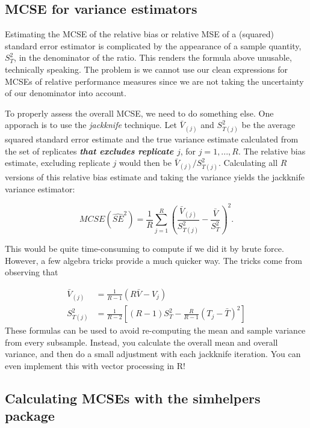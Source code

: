 \documentclass[
]{book}
\begin{document}
\hypertarget{mcse-for-variance-estimators}{%
\subsection{MCSE for variance estimators}\label{mcse-for-variance-estimators}}

Estimating the MCSE of the relative bias or relative MSE of a (squared) standard error estimator is complicated by the appearance of a sample quantity, \(S_T^2\), in the denominator of the ratio.
This renders the formula above unusable, technically speaking.
The problem is we cannot use our clean expressions for MCSEs of relative performance measures since we are not taking the uncertainty of our denominator into account.

To properly assess the overall MCSE, we need to do something else.
One apporach is to use the \emph{jackknife} technique.
Let \(\bar{V}_{(j)}\) and \(S_{T(j)}^2\) be the average squared standard error estimate and the true variance estimate calculated from the set of replicates \textbf{\emph{that excludes replicate \(j\)}}, for \(j = 1,...,R\).
The relative bias estimate, excluding replicate \(j\) would then be \(\bar{V}_{(j)} / S_{T(j)}^2\).
Calculating all \(R\) versions of this relative bias estimate and taking the variance yields the jackknife variance estimator:

\[
MCSE\left(\widehat{SE}^2\right) = \frac{1}{R} \sum_{j=1}^R \left(\frac{\bar{V}_{(j)}}{S_{T(j)}^2} - \frac{\bar{V}}{S_T^2}\right)^2.
\]

This would be quite time-consuming to compute if we did it by brute force. However, a few algebra tricks provide a much quicker way. The tricks come from observing that

\[
\begin{aligned}
\bar{V}_{(j)} &= \frac{1}{R - 1}\left(R \bar{V} - V_j\right) \\
S_{T(j)}^2 &= \frac{1}{R - 2} \left[(R - 1) S_T^2 - \frac{R}{R - 1}\left(T_j - \bar{T}\right)^2\right]
\end{aligned}
\]
These formulas can be used to avoid re-computing the mean and sample variance from every subsample.
Instead, you calculate the overall mean and overall variance, and then do a small adjustment with each jackknife iteration.
You can even implement this with vector processing in R!

\hypertarget{calculating-mcses-with-the-simhelpers-package}{%
\subsection{Calculating MCSEs with the simhelpers package}\label{calculating-mcses-with-the-simhelpers-package}}
\end{document}
